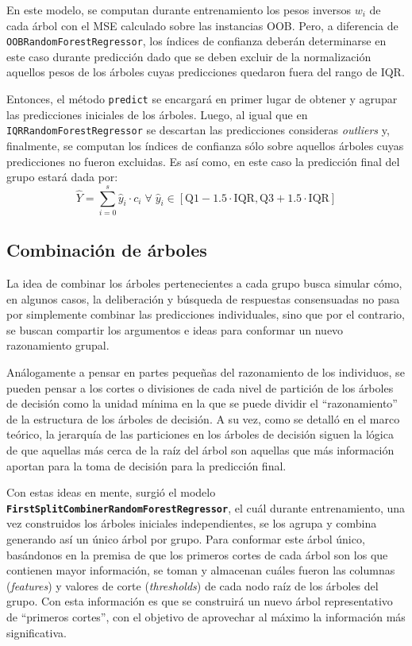 En este modelo, se computan durante entrenamiento los pesos inversos $w_i$ de cada árbol con el MSE calculado sobre las instancias OOB. Pero, a diferencia de \texttt{OOBRandomForestRegressor}, los índices de confianza deberán determinarse en este caso durante predicción dado que se deben excluir de la normalización aquellos pesos de los árboles cuyas predicciones quedaron fuera del rango de IQR.

Entonces, el método \texttt{predict} se encargará en primer lugar de obtener y agrupar las predicciones iniciales de los árboles. Luego, al igual que en \texttt{IQRRandomForestRegressor} se descartan las predicciones consideras \textit{outliers} y, finalmente, se computan los índices de confianza sólo sobre aquellos árboles cuyas predicciones no fueron excluidas. Es así como, en este caso la predicción final del grupo estará dada por:
\[
\hat{Y} = \sum_{i=0}^{s} \hat{y}_i \cdot c_i \; \forall \; \hat{y}_i \in \mathrm{[Q1 - 1.5 \cdot IQR, Q3 + 1.5 \cdot IQR]}
\]

\subsection{Combinación de árboles}

La idea de combinar los árboles pertenecientes a cada grupo busca simular cómo, en algunos casos, la deliberación y búsqueda de respuestas consensuadas no pasa por simplemente combinar las predicciones individuales, sino que por el contrario, se buscan compartir los argumentos e ideas para conformar un nuevo razonamiento grupal.

Análogamente a pensar en partes pequeñas del razonamiento de los individuos, se pueden pensar a los cortes o divisiones de cada nivel de partición de los árboles de decisión como la unidad mínima en la que se puede dividir el “razonamiento” de la estructura de los árboles de decisión. A su vez, como se detalló en el marco teórico, la jerarquía de las particiones en los árboles de decisión siguen la lógica de que aquellas más cerca de la raíz del árbol son aquellas que más información aportan para la toma de decisión para la predicción final.

Con estas ideas en mente, surgió el modelo \textbf{\texttt{FirstSplitCombinerRandomForestRegressor}}, el cuál durante entrenamiento, una vez construidos los árboles iniciales independientes, se los agrupa y combina generando así un único árbol por grupo. Para conformar este árbol único, basándonos en la premisa de que los primeros cortes de cada árbol son los que contienen mayor información, se toman y almacenan cuáles fueron las columnas (\textit{features}) y valores de corte (\textit{thresholds}) de cada nodo raíz de los árboles del grupo. Con esta información es que se construirá un nuevo árbol representativo de “primeros cortes”, con el objetivo de aprovechar al máximo la información más significativa.

